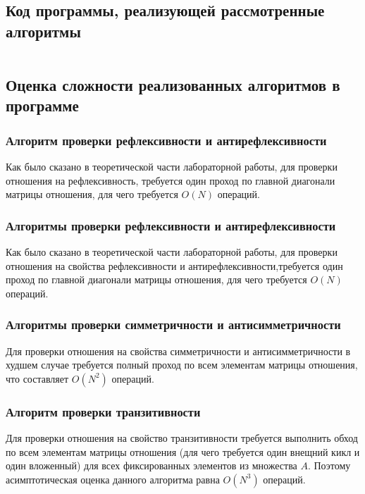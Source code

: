 \documentclass[bachelor, och, labwork]{shiza}
\begin{document}
    \subsection{Код программы, реализующей рассмотренные алгоритмы}
    
        \inputminted[linenos,breaklines=true, fontsize=\small, style=bw]{python}{code/lab1.py}

    
    \subsection{Оценка сложности реализованных алгоритмов в программе}
    

    \subsubsection{Алгоритм проверки рефлексивности и антирефлексивности}

    Как было сказано в теоретической части лабораторной работы, для проверки 
    отношения на рефлексивность, требуется один проход по главной диагонали
    матрицы отношения, для чего требуется $O(N)$ операций.

    \subsubsection{Алгоритмы проверки рефлексивности и антирефлексивности}

    Как было сказано в теоретической части лабораторной работы, для проверки 
    отношения на свойства рефлексивности и антирефлексивности,требуется один 
    проход по главной диагонали матрицы отношения, для чего требуется $O(N)$ 
    операций.

    \subsubsection{Алгоритмы проверки симметричности и антисимметричности}
    Для проверки отношения на свойства симметричности и антисимметричности 
    в худшем случае требуется полный проход по всем элементам матрицы
    отношения, что составляет $O(N^2)$ операций.

    \subsubsection{Алгоритм проверки транзитивности}
    Для проверки отношения на свойство транзитивности требуется выполнить обход 
    по всем элементам матрицы отношения (для чего требуется один внещний кикл 
    и один вложенный) для всех фиксированных элементов из множества $A$.
    Поэтому асимптотическая оценка данного алгоритма равна $O(N^3)$ операций.
\end{document}
